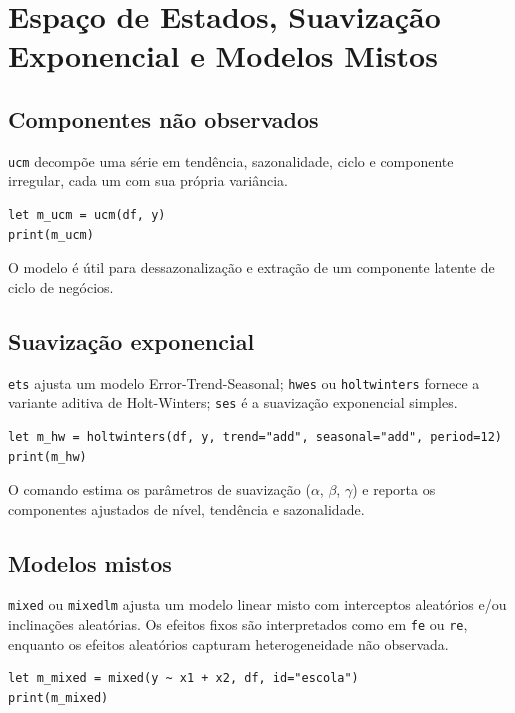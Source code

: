 \chapter{Espaço de Estados, Suavização Exponencial e Modelos Mistos}

\section{Componentes não observados}

\texttt{ucm} decompõe uma série em tendência, sazonalidade, ciclo e componente
irregular, cada um com sua própria variância.

\begin{lstlisting}[caption={UCM}]
let m_ucm = ucm(df, y)
print(m_ucm)
\end{lstlisting}

O modelo é útil para dessazonalização e extração de um componente
latente de ciclo de negócios.

\section{Suavização exponencial}

\texttt{ets} ajusta um modelo Error-Trend-Seasonal; \texttt{hwes} ou \texttt{holtwinters}
fornece a variante aditiva de Holt-Winters; \texttt{ses} é a suavização
exponencial simples.

\begin{lstlisting}[caption={Holt-Winters}]
let m_hw = holtwinters(df, y, trend="add", seasonal="add", period=12)
print(m_hw)
\end{lstlisting}

O comando estima os parâmetros de suavização ($\alpha$, $\beta$,
$\gamma$) e reporta os componentes ajustados de nível, tendência e
sazonalidade.

\section{Modelos mistos}

\texttt{mixed} ou \texttt{mixedlm} ajusta um modelo linear misto com interceptos
aleatórios e/ou inclinações aleatórias. Os efeitos fixos são
interpretados como em \texttt{fe} ou \texttt{re}, enquanto os efeitos aleatórios
capturam heterogeneidade não observada.

\begin{lstlisting}[caption={Modelo linear misto}]
let m_mixed = mixed(y ~ x1 + x2, df, id="escola")
print(m_mixed)
\end{lstlisting}

